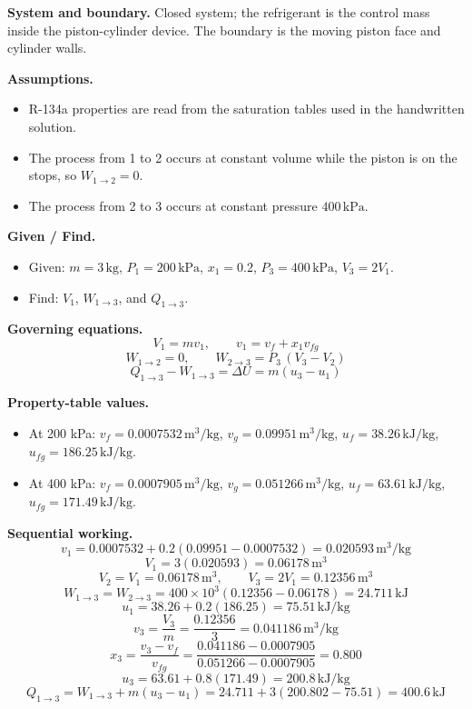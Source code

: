 \textbf{System and boundary.} Closed system; the refrigerant is the control mass inside the piston-cylinder device. The boundary is the moving piston face and cylinder walls.

\textbf{Assumptions.}
\begin{itemize}
  \item R-134a properties are read from the saturation tables used in the handwritten solution.
  \item The process from 1 to 2 occurs at constant volume while the piston is on the stops, so $W_{1\to2}=0$.
  \item The process from 2 to 3 occurs at constant pressure $400\,\text{kPa}$.
\end{itemize}

\textbf{Given / Find.}
\begin{itemize}
  \item Given: $m=3\,\text{kg}$, $P_1=200\,\text{kPa}$, $x_1=0.2$, $P_3=400\,\text{kPa}$, $V_3=2V_1$.
  \item Find: $V_1$, $W_{1\to3}$, and $Q_{1\to3}$.
\end{itemize}

\textbf{Governing equations.}
\[
V_1=mv_1,\qquad v_1=v_f+x_1v_{fg}
\]
\[
W_{1\to2}=0,\qquad W_{2\to3}=P_3\,(V_3-V_2)
\]
\[
Q_{1\to3}-W_{1\to3}=\Delta U=m(u_3-u_1)
\]

\textbf{Property-table values.}
\begin{itemize}
  \item At 200 kPa: $v_f=0.0007532\,\text{m}^3/\text{kg}$, $v_g=0.09951\,\text{m}^3/\text{kg}$, $u_f=38.26\,\text{kJ/kg}$, $u_{fg}=186.25\,\text{kJ/kg}$.
  \item At 400 kPa: $v_f=0.0007905\,\text{m}^3/\text{kg}$, $v_g=0.051266\,\text{m}^3/\text{kg}$, $u_f=63.61\,\text{kJ/kg}$, $u_{fg}=171.49\,\text{kJ/kg}$.
\end{itemize}

\textbf{Sequential working.}
\[
v_1=0.0007532+0.2(0.09951-0.0007532)=0.020593\,\text{m}^3/\text{kg}
\]
\[
V_1=3(0.020593)=0.06178\,\text{m}^3
\]
\[
V_2=V_1=0.06178\,\text{m}^3,\qquad V_3=2V_1=0.12356\,\text{m}^3
\]
\[
W_{1\to3}=W_{2\to3}=400\times10^3(0.12356-0.06178)=24.711\,\text{kJ}
\]
\[
u_1=38.26+0.2(186.25)=75.51\,\text{kJ/kg}
\]
\[
v_3=\frac{V_3}{m}=\frac{0.12356}{3}=0.041186\,\text{m}^3/\text{kg}
\]
\[
x_3=\frac{v_3-v_f}{v_{fg}}=\frac{0.041186-0.0007905}{0.051266-0.0007905}=0.800
\]
\[
u_3=63.61+0.8(171.49)=200.8\,\text{kJ/kg}
\]
\[
Q_{1\to3}=W_{1\to3}+m(u_3-u_1)=24.711+3(200.802-75.51)=400.6\,\text{kJ}
\]

